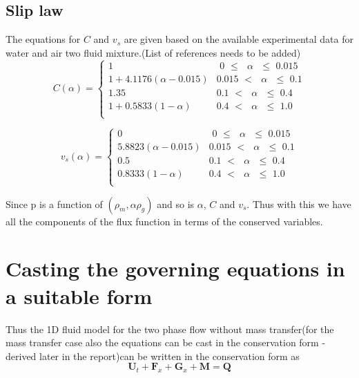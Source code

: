 \documentclass[a4paper,16pt]{article}
\begin{document}
\subsection{Slip law}
The equations for $C$ and $v_s$ are given based on the available experimental data for water and air two fluid mixture.(List of references needs to be added)
\begin{equation}
\label{C_slip}
C(\alpha) =
\begin{cases}
1 & \text{ 0 $\le$ $\alpha$ $\le$ 0.015} \\
1 + 4.1176(\alpha-0.015) & \text{0.015 $<$ $\alpha$ $\le$ 0.1}\\
1.35 & \text{0.1 $<$ $\alpha$ $\le$ 0.4}\\
1 + 0.5833(1-\alpha) & \text{0.4 $<$ $\alpha$ $\le$ 1.0}\\
\end{cases}
\end{equation}

\begin{equation}
\label{velocity_slip}
v_s(\alpha) =
\begin{cases}
0 & \text{ 0 $\le$ $\alpha$ $\le$ 0.015} \\
5.8823(\alpha-0.015) & \text{0.015 $<$ $\alpha$ $\le$ 0.1}\\
0.5 & \text{0.1 $<$ $\alpha$ $\le$ 0.4}\\
0.8333(1-\alpha) & \text{0.4 $<$ $\alpha$ $\le$ 1.0}\\
\end{cases}
\end{equation}

Since p is a function of $(\rho_m,\alpha \rho_g)$ and so is $\alpha$, $C$ and $v_s$. Thus with this we have all the components of the flux function in terms of the conserved variables.

\section{Casting the governing equations in a suitable form}
Thus the 1D fluid model for the two phase flow without mass transfer(for the mass transfer case also the equations can be cast in the conservation form - derived later in the report)can be written in the conservation form as
\begin{equation}
\textbf{U}_t + \textbf{F}_x + \textbf{G}_x + \textbf{M} = \textbf{Q}
\end{equation}
\end{document}
